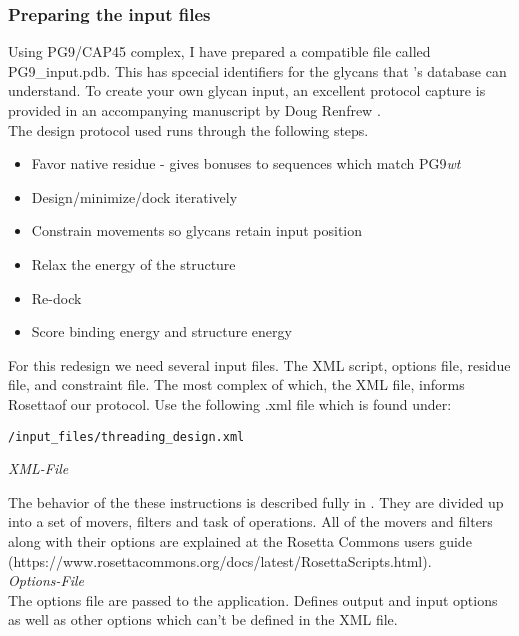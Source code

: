 \subsubsection{Preparing the input files}
Using PG9/CAP45 complex, I have prepared a \rosetta compatible file called PG9\_input.pdb. This has spcecial identifiers for the glycans that \rosetta 's database can understand. To create your own glycan input, an excellent protocol capture is provided in an accompanying manuscript by Doug Renfrew \citep{Renfrew:2012ci}. \\

The design protocol used runs through the following steps.

\begin{itemize}
\item Favor native residue - gives bonuses to sequences which match PG9\textit{wt}
\item Design/minimize/dock iteratively
\item Constrain movements so glycans retain input position
\item Relax the energy of the structure
\item Re-dock
\item Score binding energy and structure energy
\end{itemize}

For this redesign we need several input files. The XML script, options file, residue file, and constraint file. The most complex of which, the XML file, informs Rosettaof our protocol. Use the following .xml file which is found under:

\begin{verbatim}
/input_files/threading_design.xml
\end{verbatim}

\textit{XML-File}



The behavior of the these instructions is described fully in \citep{Fleishman:2011ji}. They are divided up into a set of movers, filters and task of operations. All of the movers and filters along with their options are explained at the Rosetta Commons users guide (https://www.rosettacommons.org/docs/latest/RosettaScripts.html). \\

\textit{Options-File}\\
The options file are passed to the application. Defines output and input options as well as other options which can't be defined in the XML file.

